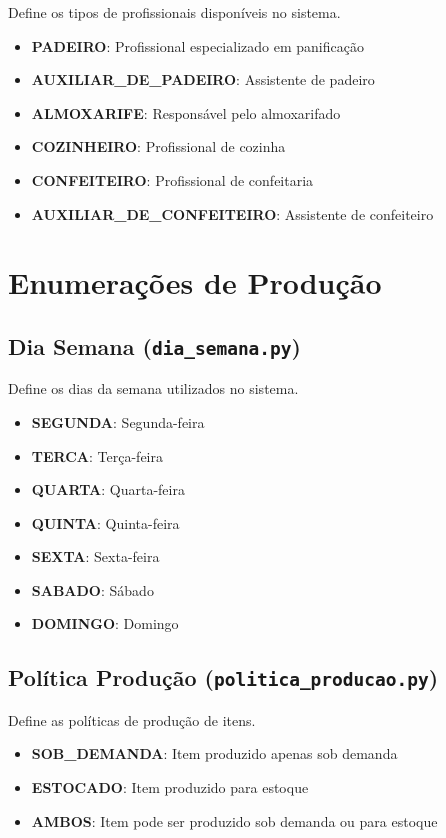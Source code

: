 \documentclass[11pt,a4paper]{article}
\begin{document}
Define os tipos de profissionais disponíveis no sistema.

\begin{itemize}[leftmargin=2cm]
    \item \textbf{PADEIRO}: Profissional especializado em panificação
    \item \textbf{AUXILIAR\_DE\_PADEIRO}: Assistente de padeiro
    \item \textbf{ALMOXARIFE}: Responsável pelo almoxarifado
    \item \textbf{COZINHEIRO}: Profissional de cozinha
    \item \textbf{CONFEITEIRO}: Profissional de confeitaria
    \item \textbf{AUXILIAR\_DE\_CONFEITEIRO}: Assistente de confeiteiro
\end{itemize}

\newpage

\section{Enumerações de Produção}

\subsection{Dia Semana (\texttt{dia\_semana.py})}

Define os dias da semana utilizados no sistema.

\begin{itemize}[leftmargin=2cm]
    \item \textbf{SEGUNDA}: Segunda-feira
    \item \textbf{TERCA}: Terça-feira
    \item \textbf{QUARTA}: Quarta-feira
    \item \textbf{QUINTA}: Quinta-feira
    \item \textbf{SEXTA}: Sexta-feira
    \item \textbf{SABADO}: Sábado
    \item \textbf{DOMINGO}: Domingo
\end{itemize}

\subsection{Política Produção (\texttt{politica\_producao.py})}

Define as políticas de produção de itens.

\begin{itemize}[leftmargin=2cm]
    \item \textbf{SOB\_DEMANDA}: Item produzido apenas sob demanda
    \item \textbf{ESTOCADO}: Item produzido para estoque
    \item \textbf{AMBOS}: Item pode ser produzido sob demanda ou para estoque
\end{itemize}
\end{document}

